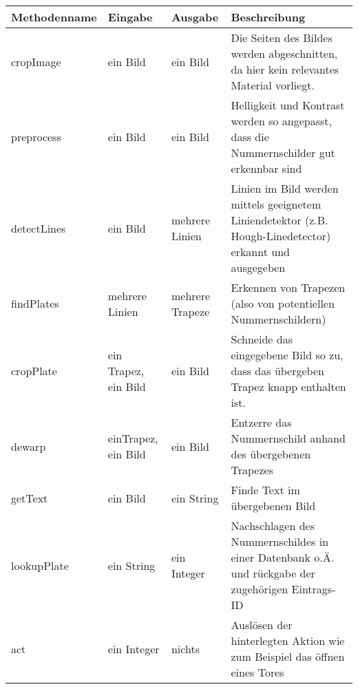 \documentclass{../Vorlage/sebDenCls}
\begin{document}
\begin{longtable}{lllp{4cm}}
\textbf{Methodenname} & \textbf{Eingabe} & \textbf{Ausgabe} & \textbf{Beschreibung}\\
\hline
cropImage & ein Bild & ein Bild & Die Seiten des Bildes werden abgeschnitten, da hier kein relevantes Material vorliegt.\\\hline
preprocess & ein Bild & ein Bild & Helligkeit und Kontrast werden so angepasst, dass die Nummernschilder gut erkennbar sind\\\hline
detectLines & ein Bild & mehrere Linien & Linien im Bild werden mittels geeignetem Liniendetektor (z.B. Hough-Linedetector) erkannt und ausgegeben\\\hline
findPlates & mehrere Linien & mehrere Trapeze & Erkennen von Trapezen (also von potentiellen Nummernschildern)\\\hline
cropPlate & ein Trapez, ein Bild & ein Bild & Schneide das eingegebene Bild so zu, dass das übergeben Trapez knapp enthalten ist.\\\hline
dewarp & einTrapez, ein Bild & ein Bild & Entzerre das Nummernschild anhand des übergebenen Trapezes\\\hline
getText & ein Bild & ein String & Finde Text im übergebenen Bild\\\hline
lookupPlate & ein String & ein Integer & Nachschlagen des Nummernschildes in einer Datenbank o.Ä. und rückgabe der zugehörigen Eintrags-ID\\\hline
act & ein Integer & nichts & Auslösen der hinterlegten Aktion wie zum Beispiel das öffnen eines Tores\\

\end{longtable}
\end{document}
